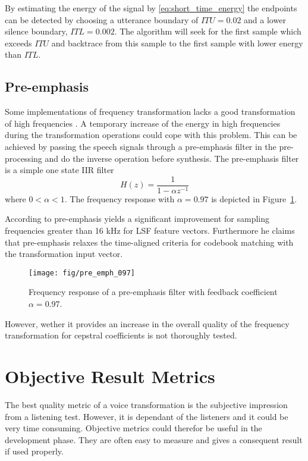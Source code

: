 By estimating the energy of the signal by \eqref{eq:short_time_energy} the endpoints can be detected by choosing a utterance boundary of \eg $ITU=0.02$ and a lower silence boundary, \eg $ITL=0.002$. The algorithm will seek for the first sample which exceeds $ITU$ and backtrace from this sample to the first sample with lower energy than $ITL$.



\subsection{Pre-emphasis} %
\label{sub:pre_emphasis}
Some implementations of frequency transformation lacks a good transformation of high frequencies \cite{turk06}. A temporary increase of the energy in high frequencies during the transformation operations could cope with this problem. This can be achieved by passing the speech signals through a pre-emphasis filter in the pre-processing and do the inverse operation before synthesis. The pre-emphasis filter is a simple one state IIR filter
\begin{equation}
	\label{eq:pre_emphasis}
	H(z) = \frac{1}{1-\alpha z^{-1}}
\end{equation}
where $0<\alpha < 1$. The frequency response with $\alpha=0.97$ is depicted in Figure~\ref{fig:pre_emph_097}.

According to \cite{turk06} pre-emphasis yields a significant improvement for sampling frequencies greater than 16 kHz for LSF feature vectors. Furthermore he claims that pre-emphasis relaxes the time-aligned criteria for codebook matching with the transformation input vector. 
\begin{figure}[htbp]
	\begin{center}
		\texttt{[image: fig/pre\_emph\_097]}
		\caption{Frequency response of a pre-emphasis filter with 
		feedback coefficient $\alpha=0.97$.}
		\label{fig:pre_emph_097}
	\end{center}
\end{figure}
However, wether it provides an increase in the overall quality of the frequency transformation for cepstral coefficients is not thoroughly tested.


\section{Objective Result Metrics} %
\label{sec:objective_metrics}
The best quality metric of a voice transformation is the subjective impression from a listening test. However, it is dependant of the listeners and it could be very time consuming. Objective metrics could therefor be useful in the development phase. They are often easy to measure and gives a consequent result if used properly. 

